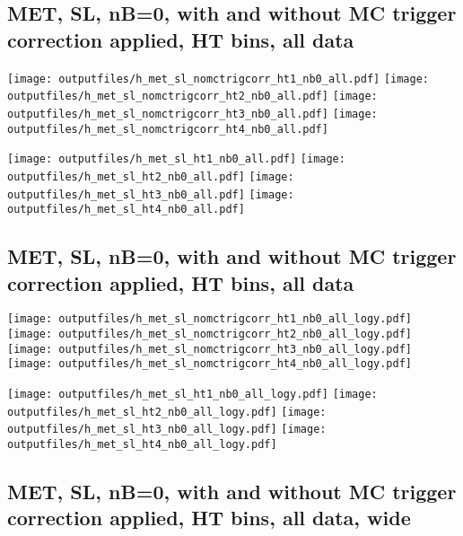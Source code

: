 \documentclass[11pt]{article}
\begin{document}
     \subsection{ MET, SL, nB=0, with and without MC trigger correction applied, HT bins, all data}

    \noindent
     \texttt{[image: outputfiles/h\_met\_sl\_nomctrigcorr\_ht1\_nb0\_all.pdf]}
     \texttt{[image: outputfiles/h\_met\_sl\_nomctrigcorr\_ht2\_nb0\_all.pdf]}
     \texttt{[image: outputfiles/h\_met\_sl\_nomctrigcorr\_ht3\_nb0\_all.pdf]}
     \texttt{[image: outputfiles/h\_met\_sl\_nomctrigcorr\_ht4\_nb0\_all.pdf]}

    \noindent
     \texttt{[image: outputfiles/h\_met\_sl\_ht1\_nb0\_all.pdf]}
     \texttt{[image: outputfiles/h\_met\_sl\_ht2\_nb0\_all.pdf]}
     \texttt{[image: outputfiles/h\_met\_sl\_ht3\_nb0\_all.pdf]}
     \texttt{[image: outputfiles/h\_met\_sl\_ht4\_nb0\_all.pdf]}

    \clearpage
     \subsection{ MET, SL, nB=0, with and without MC trigger correction applied, HT bins, all data}

    \noindent
     \texttt{[image: outputfiles/h\_met\_sl\_nomctrigcorr\_ht1\_nb0\_all\_logy.pdf]}
     \texttt{[image: outputfiles/h\_met\_sl\_nomctrigcorr\_ht2\_nb0\_all\_logy.pdf]}
     \texttt{[image: outputfiles/h\_met\_sl\_nomctrigcorr\_ht3\_nb0\_all\_logy.pdf]}
     \texttt{[image: outputfiles/h\_met\_sl\_nomctrigcorr\_ht4\_nb0\_all\_logy.pdf]}


    \noindent
     \texttt{[image: outputfiles/h\_met\_sl\_ht1\_nb0\_all\_logy.pdf]}
     \texttt{[image: outputfiles/h\_met\_sl\_ht2\_nb0\_all\_logy.pdf]}
     \texttt{[image: outputfiles/h\_met\_sl\_ht3\_nb0\_all\_logy.pdf]}
     \texttt{[image: outputfiles/h\_met\_sl\_ht4\_nb0\_all\_logy.pdf]}


     \clearpage
     \subsection{ MET, SL, nB=0, with and without MC trigger correction applied, HT bins, all data, wide}
\end{document}
